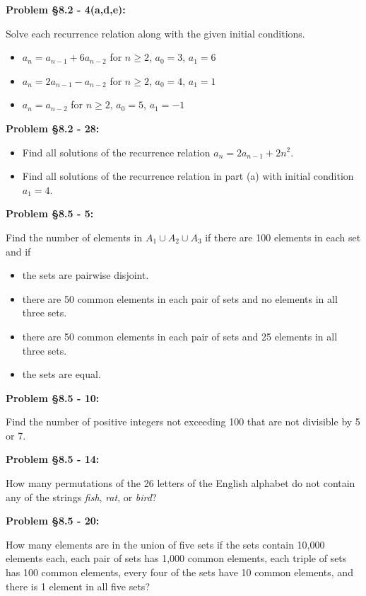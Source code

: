 \documentclass{article}
\newenvironment{problem}[1]
    {\begin{mdframed}[default]
    \textbf{Problem #1:}
    }
    {\end{mdframed}
    }
\begin{document}
\begin{problem}{\S 8.2 - 4(a,d,e)}
Solve each recurrence relation along with the given initial conditions.
\begin{itemize}
    \item[(a)] $a_n = a_{n-1} + 6a_{n-2}$ for $n \geq 2$, $a_0 = 3$, $a_1 = 6$
    \item[(d)] $a_n = 2a_{n-1} - a_{n-2}$ for $n \geq 2$, $a_0 = 4$, $a_1 = 1$
    \item[(e)] $a_n = a_{n-2}$ for $n \geq 2$, $a_0 = 5$, $a_1 = -1$
\end{itemize}
\end{problem}

\begin{problem}{\S 8.2 - 28}
\begin{itemize}
    \item[(a)] Find all solutions of the recurrence relation $a_n = 2a_{n-1} + 2n^2$.
    \item[(b)] Find all solutions of the recurrence relation in part (a) with initial condition $a_1 = 4$.
\end{itemize}
\end{problem}

\begin{problem}{\S 8.5 - 5}
Find the number of elements in $A_1 \cup A_2 \cup A_3$ if there are 100 elements in each set and if
\begin{itemize}
    \item[(a)] the sets are pairwise disjoint.
    \item[(b)] there are 50 common elements in each pair of sets and no elements in all three sets.
    \item[(c)] there are 50 common elements in each pair of sets and 25 elements in all three sets.
    \item[(d)] the sets are equal.
\end{itemize}
\end{problem}

\begin{problem}{\S 8.5 - 10}
Find the number of positive integers not exceeding 100 that are not divisible by 5 or 7.
\end{problem}

\begin{problem}{\S 8.5 - 14}
How many permutations of the 26 letters of the English alphabet do not contain any of the strings \emph{fish}, \emph{rat}, or \emph{bird}?
\end{problem}

\begin{problem}{\S 8.5 - 20}
How many elements are in the union of five sets if the sets contain 10,000 elements each, each pair of sets has 1,000 common elements, each triple of sets has 100 common elements, every four of the sets have 10 common elements, and there is 1 element in all five sets?
\end{problem}
\end{document}
